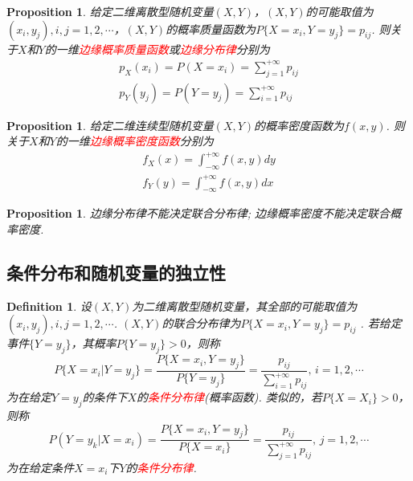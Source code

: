 \documentclass{article}
\newtheorem{proposition}[theorem]{Proposition}
\newtheorem{definition}[theorem]{Definition}
\newcommand{\redt}[1]{\textcolor{red}{#1}}
\begin{document}
\begin{proposition}
\rm 给定二维离散型随机变量$(X,Y)$，$(X,Y)$的可能取值为$(x_i,y_j), i,j =1,2,\cdots$，$(X,Y)$的概率质量函数为$P\{X = x_i,Y = y_j\}=p_{ij}$. 则关于$X$和$Y$的一维\redt{边缘概率质量函数}或\redt{边缘分布律}分别为
$$
\begin{array}{ll}
p_X(x_i) = P(X=x_i) = \sum\limits_{j=1}^{+\infty}p_{ij} \\
p_Y(y_j) = P(Y=y_j) = \sum\limits_{i=1}^{+\infty}p_{ij}  
\end{array}
$$
\end{proposition}

\begin{proposition}
\rm 给定二维连续型随机变量$(X,Y)$的概率密度函数为$f(x,y)$. 则关于$X$和$Y$的一维\redt{边缘概率密度函数}分别为
$$
\begin{array}{ll}
f_X(x) = \int_{-\infty}^{+\infty}f(x,y)dy \\
f_Y(y) = \int_{-\infty}^{+\infty}f(x,y)dx
\end{array}
$$
\end{proposition}

\begin{proposition}
\rm 边缘分布律不能决定联合分布律; 边缘概率密度不能决定联合概率密度. 
\end{proposition}

\subsection{条件分布和随机变量的独立性}

\begin{definition}
\rm 设$(X,Y)$为二维离散型随机变量，其全部的可能取值为$(x_i,y_j), i,j=1,2,\cdots$. $(X,Y)$的联合分布律为$P\{X=x_i,Y=y_j\}=p_{ij}$ . 若给定事件$\{Y=y_j\}$，其概率$P\{Y=y_j\} > 0$，则称
$$
P\{X=x_i | Y=y_j\} = \frac{P\{X=x_i,Y=y_j\}}{P\{Y=y_j\}} = \frac{p_{ij}}{\sum\limits_{i=1}^{+\infty} p_{ij}}, \, i=1,2,\cdots 
$$
为在给定$Y=y_j$的条件下$X$的\redt{条件分布律}(概率函数). 类似的，若$P\{X=X_i\}>0$，则称
$$
P(Y=y_k|X=x_i) = \frac{P\{X=x_i,Y=y_j\}}{P\{X=x_i\}} = \frac{p_{ij}}{\sum\limits_{j=1}^{+\infty} p_{ij}}, \, j=1,2,\cdots
$$
为在给定条件$X=x_i$下$Y$的\redt{条件分布律}. 
\end{definition}
\end{document}
